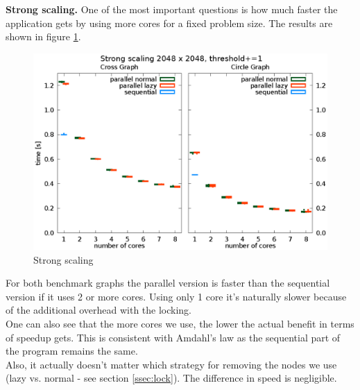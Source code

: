 \documentclass[letterpaper]{article}
\newcommand{\mypar}[1]{{\bf #1.}}
\begin{document}
\mypar{Strong scaling}
One of the most important questions is how much faster the application gets by using more cores for a fixed problem size. The results are shown in figure \ref{fig:strong_scaling}.
\begin{figure}[h]\centering
  \includegraphics[scale=0.558]{strong_scaling.eps}
  \caption{Strong scaling \label{fig:strong_scaling}}
\end{figure}
For both benchmark graphs the parallel version is faster than the sequential version if it uses 2 or more cores. Using only 1 core it's naturally slower because of the additional overhead with the locking.\\
One can also see that the more cores we use, the lower the actual benefit in terms of speedup gets. This is consistent with Amdahl's law as the sequential part of the program remains the same.\\
Also, it actually doesn't matter which strategy for removing the nodes we use (lazy vs. normal - see section \ref{ssec:lock}). The difference in speed is negligible.
\end{document}
